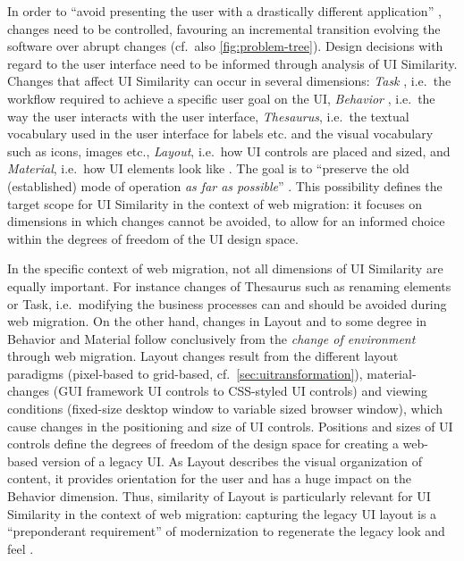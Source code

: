 In order to ``avoid presenting the user with a drastically different application'' \autocite{Distante2006a}, changes need to be controlled, favouring an incremental transition evolving the software over abrupt changes (cf.~also \cref{fig:problem-tree}).
Design decisions with regard to the user interface need to be informed through analysis of UI Similarity.
Changes that affect UI Similarity can occur in several dimensions: \emph{Task} \autocite{Bakaev2017WebIntelligence,Stroulia2002}, i.e.~the workflow required to achieve a specific user goal on the UI, \emph{Behavior} \autocite{Stroulia2002}, i.e.~the way the user interacts with the user interface, \emph{Thesaurus}, i.e.~the textual vocabulary used in the user interface for labels etc.
and the visual vocabulary such as icons, images etc., \emph{Layout}, i.e.~how UI controls are placed and sized, and \emph{Material}, i.e.~how UI elements look like \autocite{Bakaev2017Kansei}.
The goal is to ``preserve the old (established) mode of operation \emph{as far as possible}'' \autocite{Distante2006a}.
This possibility defines the target scope for UI Similarity in the context of web migration: it focuses on dimensions in which changes cannot be avoided, to allow for an informed choice within the degrees of freedom of the UI design space.

In the specific context of web migration, not all dimensions of UI Similarity are equally important.
For instance changes of Thesaurus such as renaming elements or Task, i.e.~modifying the business processes can and should be avoided \autocite{Sneed2010SoftwareMigration,Sneed1995CostBenefit} during web migration.
On the other hand, changes in Layout and to some degree in Behavior and Material follow conclusively from the \emph{change of environment} \autocite{SWEBOK2014} through web migration.
Layout changes result from the different layout paradigms (pixel-based to grid-based, cf.~\cref{sec:uitransformation}), material-changes (GUI framework UI controls to CSS-styled UI controls) and viewing conditions (fixed-size desktop window to variable sized browser window), which cause changes in the positioning and size of UI controls.
Positions and sizes of UI controls define the degrees of freedom of the design space for creating a web-based version of a legacy UI.
As Layout describes the visual organization of content, it provides orientation for the user and has a huge impact on the Behavior dimension.
Thus, similarity of Layout is particularly relevant for UI Similarity in the context of web migration: capturing the legacy UI layout is a ``preponderant requirement'' of modernization to regenerate the legacy look and feel \autocite{Rodriguez-Echeverria2012MIGRARIA}.

